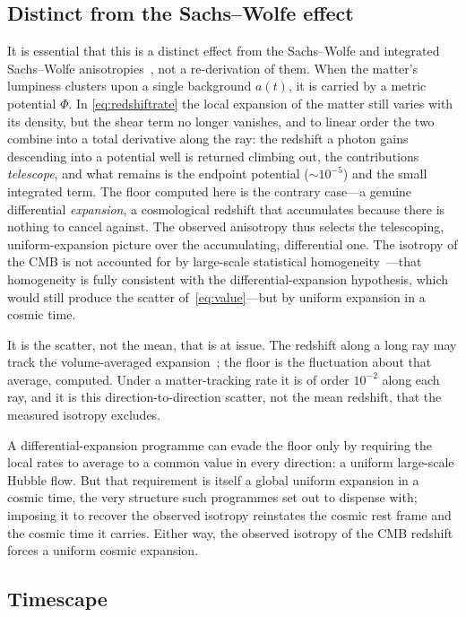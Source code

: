 \documentclass[twocolumn]{aastex701}
\begin{document}
\subsection{Distinct from the Sachs--Wolfe effect}\label{sec:sw}

It is essential that this is a distinct effect from the Sachs--Wolfe and integrated Sachs--Wolfe anisotropies~\citep{Sachs1967, Rees1968}, not a re-derivation of them. When the matter's lumpiness clusters upon a single background $a(t)$, it is carried by a metric potential $\Phi$. In \eqref{eq:redshiftrate} the local expansion of the matter still varies with its density, but the shear term no longer vanishes, and to linear order the two combine into a total derivative along the ray: the redshift a photon gains descending into a potential well is returned climbing out, the contributions \emph{telescope}, and what remains is the endpoint potential ($\sim\!10^{-5}$) and the small integrated term. The floor computed here is the contrary case---a genuine differential \emph{expansion}, a cosmological redshift that accumulates because there is nothing to cancel against. The observed anisotropy thus selects the telescoping, uniform-expansion picture over the accumulating, differential one. The isotropy of the CMB is not accounted for by large-scale statistical homogeneity~\citep{Scrimgeour2012}---that homogeneity is fully consistent with the differential-expansion hypothesis, which would still produce the scatter of~\eqref{eq:value}---but by uniform expansion in a cosmic time.

It is the scatter, not the mean, that is at issue. The redshift along a long ray may track the volume-averaged expansion~\citep{Rasanen2009}; the floor is the fluctuation about that average, computed. Under a matter-tracking rate it is of order $10^{-2}$ along each ray, and it is this direction-to-direction scatter, not the mean redshift, that the measured isotropy excludes.

A differential-expansion programme can evade the floor only by requiring the local rates to average to a common value in every direction: a uniform large-scale Hubble flow. But that requirement is itself a global uniform expansion in a cosmic time, the very structure such programmes set out to dispense with; imposing it to recover the observed isotropy reinstates the cosmic rest frame and the cosmic time it carries. Either way, the observed isotropy of the CMB redshift forces a uniform cosmic expansion.

\subsection{Timescape}\label{sec:timescape}
\end{document}
